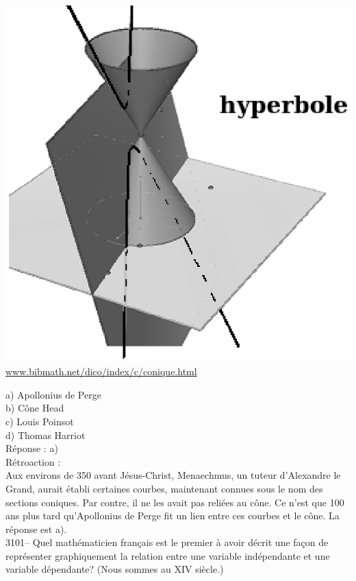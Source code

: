 \documentclass[letterpaper, 12pt]{article}
\begin{document}
\begin{center}
\includegraphics[scale=0.5]{conique_hyperbole.eps}\\
\href{http://www.bibmath.net/dico/index.php3?action=affiche&quoi=./c/conique.html}{www.bibmath.net/dico/index/c/conique.html}\\
\end{center}

a) Apollonius de Perge\\
b) C\^one Head\\
c) Louis Poinsot\\
d) Thomas Harriot\\

R\'eponse : a)\\

R\'etroaction :\\
Aux environs de 350 avant J\'esus-Christ, Menaechmus, un tuteur d'Alexandre le Grand, aurait \'etabli certaines courbes, maintenant connues sous le nom des sections coniques. Par contre, il ne les avait pas reli\'ees au c\^one. Ce n'est que 100 ans plus tard qu'Apollonius de Perge fit un lien entre ces courbes et le c\^one. La r\'eponse est a).\\



3101-- Quel math\'ematicien fran\c cais est le premier \`a avoir d\'ecrit une fa\c con de repr\'esenter graphiquement la relation entre une variable ind\'ependante et une variable d\'ependante? (Nous sommes au {\scriptsize XIV\ieme{}} si\`ecle.)\\
\end{document}

